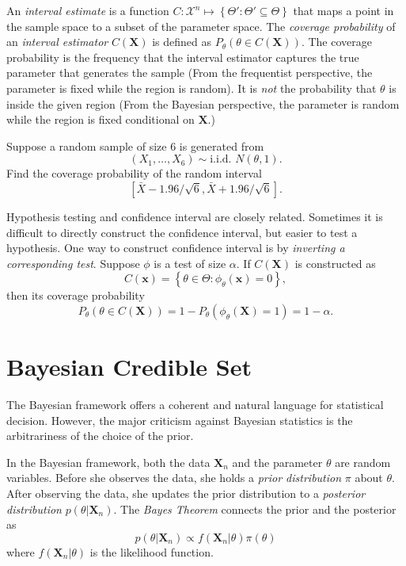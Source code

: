 \documentclass[11pt]{article}
\begin{document}
An \emph{interval estimate} is a function
\(C:\mathcal{X}^{n}\mapsto\left\{ \Theta':\Theta'\subseteq\Theta\right\}\)
that maps a point in the sample space to a subset of the parameter
space. The \emph{coverage probability} of an \emph{interval estimator}
\(C\left(\mathbf{X}\right)\) is defined as
\(P_{\theta}\left(\theta\in C\left(\mathbf{X}\right)\right)\). The
coverage probability is the frequency that the interval estimator
captures the true parameter that generates the sample (From the
frequentist perspective, the parameter is fixed while the region is
random). It is \emph{not} the probability that \(\theta\) is inside the
given region (From the Bayesian perspective, the parameter is random
while the region is fixed conditional on \(\mathbf{X}\).)

Suppose a random sample of size 6 is generated from
\[\left(X_{1},\ldots,X_{6}\right)\sim\text{i.i.d. }N\left(\theta,1\right).\]
Find the coverage probability of the random interval
\[\left[\bar{X}-1.96/\sqrt{6},\bar{X}+1.96/\sqrt{6}\right].\]

Hypothesis testing and confidence interval are closely related.
Sometimes it is difficult to directly construct the confidence interval,
but easier to test a hypothesis. One way to construct confidence
interval is by \emph{inverting a corresponding test}. Suppose \(\phi\)
is a test of size \(\alpha\). If \(C\left(\mathbf{X}\right)\) is
constructed as
\[C\left(\mathbf{x}\right)=\left\{ \theta\in\Theta:\phi_{\theta}\left(\mathbf{x}\right)=0\right\},\]
then its coverage probability
\[P_{\theta}\left(\theta\in C\left(\mathbf{X}\right)\right)=1-P_{\theta}\left(\phi_{\theta}\left(\mathbf{X}\right)=1\right)=1-\alpha.\]





\section{Bayesian Credible Set}



The Bayesian framework offers a coherent and natural language for statistical decision.
However, the major criticism against Bayesian statistics is the arbitrariness of the choice
of the prior. 

In the Bayesian framework, both the data $\mathbf{X}_n$ and the parameter $\theta$ are random variables.
Before she observes the data, she holds a \emph{prior distribution} $\pi$ about $\theta$.
After observing the data, she updates the prior distribution to a
\emph{posterior distribution} $p(\theta | \mathbf{X}_n)$. 
The \emph{Bayes Theorem} connects the prior and the posterior as
\[
p( \theta| \mathbf{X}_n ) \propto f( \mathbf{X}_n | \theta ) \pi(\theta)
\]
where $f( \mathbf{X}_n | \theta )$ is the likelihood function.
\end{document}
